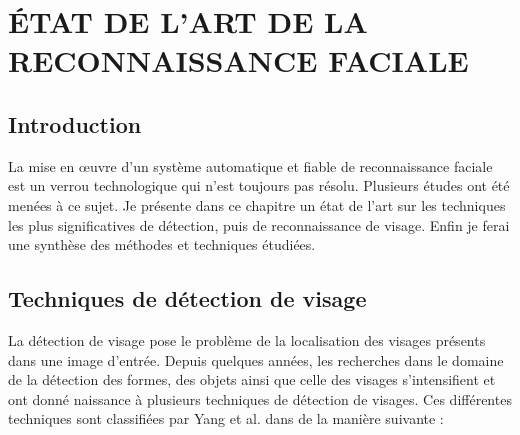 \chapter{ÉTAT DE L'ART DE LA RECONNAISSANCE FACIALE }

\section{Introduction}
La mise en œuvre d'un système automatique et fiable de reconnaissance faciale est un verrou technologique qui n'est toujours pas résolu. Plusieurs études ont été menées à  ce sujet. Je présente dans ce chapitre un état de l'art sur les techniques les plus significatives de détection, puis de reconnaissance de visage. Enfin je ferai une synthèse des méthodes et techniques étudiées.

\section{Techniques de détection de visage}
\label{detection}
La détection de visage pose le problème de la localisation des visages présents dans une image d'entrée. Depuis quelques années, les recherches dans le domaine de la détection des formes, des objets ainsi que celle des visages s'intensifient et ont donné naissance à plusieurs techniques de détection de visages. Ces différentes techniques sont classifiées par Yang et al. dans \citep{Yan01} de la manière suivante :
